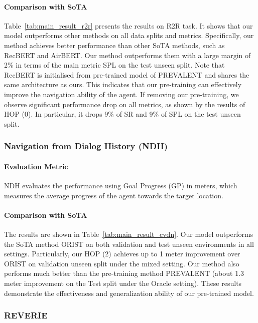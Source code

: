 \documentclass[10pt,twocolumn,letterpaper]{article}
\begin{document}
\paragraph{Comparison with SoTA}
Table~\ref{tab:main_result_r2r} presents the results on R2R task. It shows that our model outperforms other methods on all data splits and metrics. 
Specifically, our method achieves better performance than other SoTA methods, such as RecBERT and AirBERT. Our method outperforms them with a large margin of 2\% in terms of the main metric SPL  on the test unseen split. 
Note that RecBERT is initialised from pre-trained model of PREVALENT and shares the same architecture as ours.
This indicates that our pre-training can effectively improve the navigation ability of the agent.
If removing our pre-training, we observe significant performance drop  on  all metrics, as shown by the results of HOP (0). In particular, it drops 9\% of SR and 9\% of SPL on the test unseen split.
\vspace{-8pt}
\subsubsection{Navigation from Dialog History (NDH)}

\paragraph{Evaluation Metric}
NDH evaluates the performance using Goal Progress (GP) in meters, which measures the average progress of the agent towards the target location. 
\vspace{-10pt}
\paragraph{Comparison with SoTA}
The results are shown in Table~\ref{tab:main_result_cvdn}. Our model outperforms the SoTA method ORIST \cite{orist} on both validation and test unseen environments in all settings. Particularly, our HOP (2) achieves up to 1 meter improvement over ORIST on validation unseen split under the mixed setting. Our method also performs much better than the pre-training method PREVALENT (about 1.3 meter improvement on the Test split under the Oracle setting). These results demonstrate the effectiveness and generalization ability of our pre-trained model.

\vspace{-0pt}
\subsubsection{REVERIE}
\end{document}
